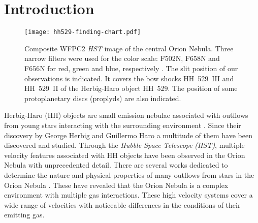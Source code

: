 \documentclass[fleqn,usenatbib]{mnras}
\begin{document}

\section{Introduction}
\label{sec:introduction}

\begin{figure*}
\texttt{[image: hh529-finding-chart.pdf]}
\caption{Composite WFPC2 \textit{HST} image of the central Orion Nebula. Three narrow filters were used for the color scale: F502N, F658N and F656N for red, green and blue, respectively \citep[images obtained by][]{Bally:1998a}. The slit position of our observations is indicated. It covers the bow shocks HH~529~III and HH~529~II of the Herbig-Haro object HH~529. The position of some protoplanetary discs (proplyds) are also indicated.}
\label{fig:hst}
\end{figure*} 

Herbig-Haro (HH) objects are small emission nebulae associated with  outflows from young stars interacting with the surrounding environment \citep{Schwartz83}. Since their discovery by George Herbig and Guillermo Haro \citep{Herbig50,Herbig51, Herbig52, Haro52, Haro53} a multitude of them have been discovered and studied. Through the \textit{Hubble Space Telescope} \textit{(HST)}, multiple velocity features associated with HH objects have been observed in the Orion Nebula with unprecedented detail. There are several works dedicated to determine the nature and physical properties of many outflows from stars in the Orion Nebula \citep[see][and references therein]{bally00,bally01,odellyhenney08,Odell15}. These have revealed that the Orion Nebula is a complex environment with multiple gas interactions. These high velocity systems cover a wide range of velocities with noticeable differences in the conditions of their emitting gas.
\end{document}
